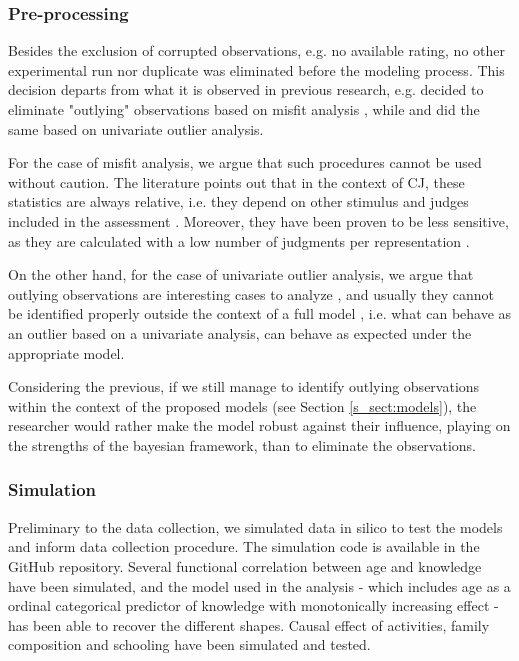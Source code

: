 \subsubsection{Pre-processing} \label{ssSA:preprocessing}
%
Besides the exclusion of corrupted observations, e.g. no available rating, no other experimental run nor duplicate was eliminated before the modeling process. This decision departs from what it is observed in previous research, e.g. \citet{Boonen_et_al_2020} decided to eliminate "outlying" observations based on misfit analysis \citep{Lesterhuis_2018}, while \citet{vanDaal_2020} and \citet{Boonen_et_al_2021} did the same based on univariate outlier analysis. 

For the case of misfit analysis, we argue that such procedures cannot be used without caution. The literature points out that in the context of CJ, these statistics are always relative, i.e. they depend on other stimulus and judges included in the assessment \citep{Pollitt_2012a, Pollitt_2012b}. Moreover, they have been proven to be less sensitive, as they are calculated with a low number of judgments per representation \citep{Pollitt_2012a}. 

On the other hand, for the case of univariate outlier analysis, we argue that outlying observations are interesting cases to analyze \citep{McElreath_2020}, and usually they cannot be identified properly outside the context of a full model \citep{McElreath_2020}, i.e. what can behave as an outlier based on a univariate analysis, can behave as expected under the appropriate model. 

Considering the previous, if we still manage to identify outlying observations within the context of the proposed models (see Section \ref{s_sect:models}), the researcher would rather make the model robust against their influence, playing on the strengths of the bayesian framework, than to eliminate the observations. 
%
%
\subsubsection{Simulation} \label{ssSA:model_simulation}
Preliminary to the data collection, we simulated data in silico to test the models and inform data collection procedure. The simulation code is available in the GitHub repository. Several functional correlation between age and knowledge have been simulated, and the model used in the analysis - which includes age as a ordinal categorical predictor of knowledge with monotonically increasing effect - has been able to recover the different shapes. Causal effect of activities, family composition and schooling have been simulated and tested.

